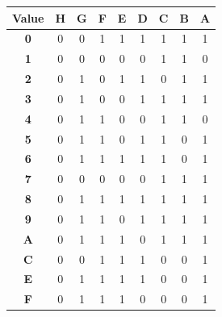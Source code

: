 \documentclass[pdftex,12pt,a4paper]{article}
\begin{document}
\begin{table}[H]
\centering
\begin{tabular}{|c|c|c|c|c|c|c|c|c|}
\hline
\textbf{Value} & \textbf{H} & \textbf{G} & \textbf{F} & \textbf{E} & \textbf{D} & \textbf{C} & \textbf{B} & \textbf{A} \\ \hline
\textbf{0}     & 0          & 0          & 1          & 1          & 1          & 1          & 1          & 1          \\ \hline
\textbf{1}     & 0          & 0          & 0          & 0          & 0          & 1          & 1          & 0          \\ \hline
\textbf{2}     & 0          & 1          & 0          & 1          & 1          & 0          & 1          & 1          \\ \hline
\textbf{3}     & 0          & 1          & 0          & 0          & 1          & 1          & 1          & 1          \\ \hline
\textbf{4}     & 0          & 1          & 1          & 0          & 0          & 1          & 1          & 0          \\ \hline
\textbf{5}     & 0          & 1          & 1          & 0          & 1          & 1          & 0          & 1          \\ \hline
\textbf{6}     & 0          & 1          & 1          & 1          & 1          & 1          & 0          & 1          \\ \hline
\textbf{7}     & 0          & 0          & 0          & 0          & 0          & 1          & 1          & 1          \\ \hline
\textbf{8}     & 0          & 1          & 1          & 1          & 1          & 1          & 1          & 1          \\ \hline
\textbf{9}     & 0          & 1          & 1          & 0          & 1          & 1          & 1          & 1          \\ \hline
\textbf{A}     & 0          & 1          & 1          & 1          & 0          & 1          & 1          & 1          \\ \hline
\textbf{C}     & 0          & 0          & 1          & 1          & 1          & 0          & 0          & 1          \\ \hline
\textbf{E}     & 0          & 1          & 1          & 1          & 1          & 0          & 0          & 1          \\ \hline
\textbf{F}     & 0          & 1          & 1          & 1          & 0          & 0          & 0          & 1          \\ \hline

\end{tabular}
\end{table}
\end{document}
